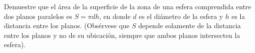 \item Demuestre que el área de la superficie de la zona de una esfera comprendida entre dos planos paralelos es $S = \pi dh$, en donde $d$ es el diámetro de la esfera y $h$ es la distancia entre los planos. (Obsérvese que $S$ depende solamente de la distancia entre los planos y no de su ubicación, siempre que ambos planos intersecten la esfera).
